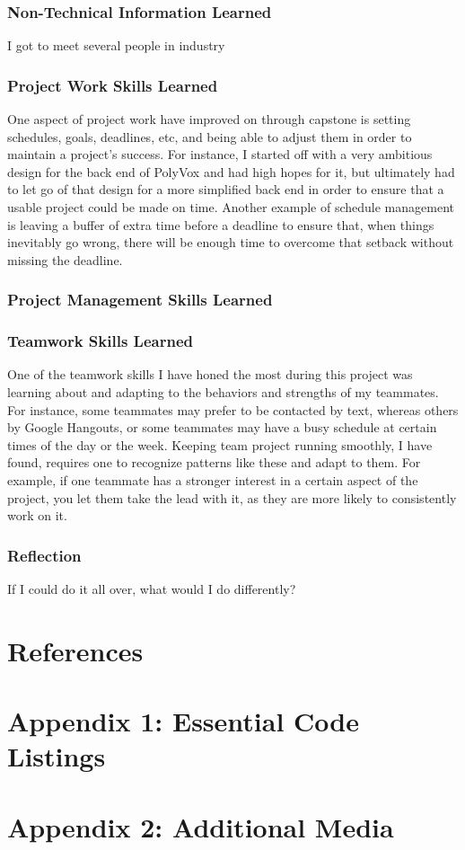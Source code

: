 \documentclass[onecolumn, draftclsnofoot,10pt, compsoc]{IEEEtran}
\begin{document}
\subsubsection{Non-Technical Information Learned}

I got to meet several people in industry 


\subsubsection{Project Work Skills Learned}

One aspect of project work have improved on through capstone is setting schedules, goals, deadlines, etc, and being able to adjust them in order to maintain a project’s success. For instance, I started off with a very ambitious design for the back end of PolyVox and had high hopes for it, but ultimately had to let go of that design for a more simplified back end in order to ensure that a usable project could be made on time. Another example of schedule management is leaving a buffer of extra time before a deadline to ensure that, when things inevitably go wrong, there will be enough time to overcome that setback without missing the deadline.


\subsubsection{Project Management Skills Learned}




\subsubsection{Teamwork Skills Learned}

One of the teamwork skills I have honed the most during this project was learning about and adapting to the behaviors and strengths of my teammates. For instance, some teammates may prefer to be contacted by text, whereas others by Google Hangouts, or some teammates may have a busy schedule at certain times of the day or the week. Keeping team project running smoothly, I have found, requires one to recognize patterns like these and adapt to them. For example, if one teammate has a stronger interest in a certain aspect of the project, you let them take the lead with it, as they are more likely to consistently work on it.


\subsubsection{Reflection}

If I could do it all over, what would I do differently?


\section{References}


\appendix

\section{Appendix 1: Essential Code Listings}

\section{Appendix 2: Additional Media}
\end{document}
